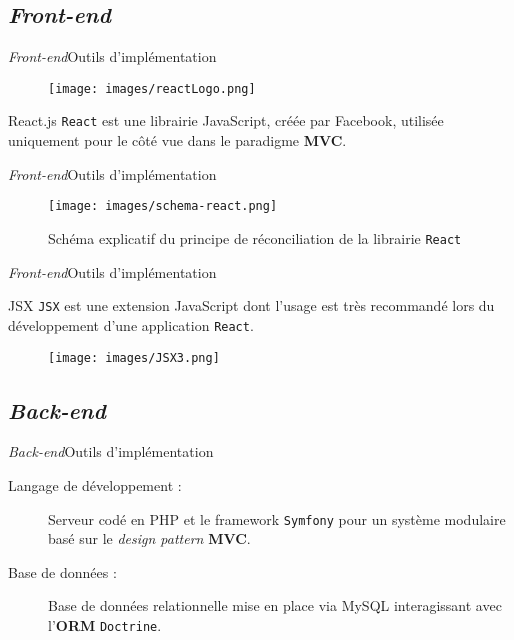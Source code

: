 \documentclass[usenames,dvipsnames]{beamer}
\begin{document}
\subsection{\protect\textit{Front-end}}
\begin{frame}{\textit{Front-end}}{Outils d'implémentation}
  \begin{figure}
    \begin{center}
      \texttt{[image: images/reactLogo.png]}
    \end{center}
  \end{figure}
\begin{block}{React.js}
\texttt{React} est une librairie JavaScript, créée par Facebook, utilisée uniquement pour le côté \og vue \fg dans le paradigme \textbf{MVC}.
\end{block}
\end{frame}

\begin{frame}{\textit{Front-end}}{Outils d'implémentation}
\begin{figure}
  \texttt{[image: images/schema-react.png]}
  \caption{Schéma explicatif du principe de réconciliation de la librairie \texttt{React}}
\end{figure}
\end{frame}

\begin{frame}{\textit{Front-end}}{Outils d'implémentation}
  \begin{block}{JSX}
  \texttt{JSX} est une extension JavaScript dont l'usage est très recommandé lors du développement d'une application \texttt{React}.
  \end{block}
  \begin{figure}[!ht]
    \centering
    \texttt{[image: images/JSX3.png]}
  \end{figure}
\end{frame}

\subsection{\protect\textit{Back-end}}
\begin{frame}{\textit{Back-end}}{Outils d'implémentation}
  \begin{description}
    \item[Langage de développement :] Serveur codé en PHP et le framework \texttt{Symfony} pour un système modulaire basé sur le \textit{design pattern} \textbf{MVC}.
    \item[Base de données :] Base de données relationnelle mise en place via MySQL interagissant avec l'\textbf{ORM} \texttt{Doctrine}.
  \end{description}
\end{frame}
\end{document}
